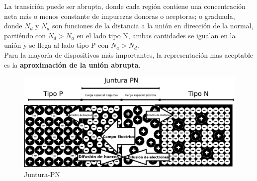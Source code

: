 \documentclass[oneside]{book}
\numberwithin{equation}{section}
\numberwithin{figure}{section}
\numberwithin{table}{section}
\begin{document}
			La transición puede ser abrupta, donde cada región contiene una concentración neta más o menos constante de impurezas donoras o aceptoras; o graduada, donde $N_d$ y $N_a$ son funciones de la distancia a la unión en dirección de la normal, partiéndo con $N_d>N_a$ en el lado tipo N, ambas cantidades se igualan en la unión y se llega al lado tipo P con $N_a>N_d$.\\
		
			Para la mayoría de dispositivos más importantes, la representación mas aceptable es la \textbf{aproximación de la unión abrupta}.\\
		
				\begin{figure}[H]
					\begin{center}
						\includegraphics[scale=0.2]{Juntura-PN.jpeg}
						\caption{Juntura-PN}
					\end{center}
				\end{figure}			
		
\end{document}
